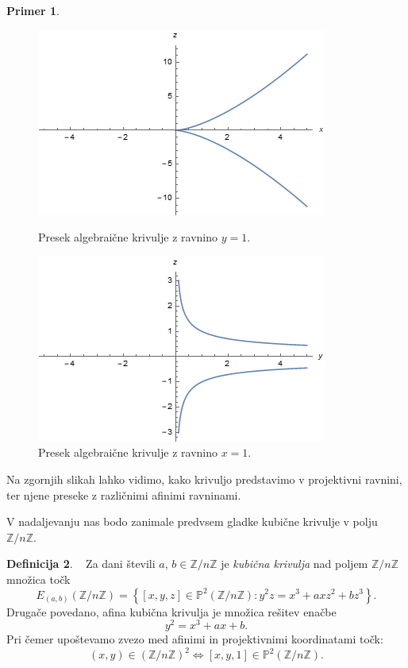 \documentclass[12pt,a4paper,twoside]{article}
\theoremstyle{definition} %
\newtheorem{definicija}{Definicija}[section]
\newtheorem{primer}[definicija]{Primer}
\theoremstyle{plain} %
\numberwithin{equation}{section}  %
\newcommand{\Z}{\mathbb Z}
\newcommand{\PP}{\mathbb P}
\begin{document}
\begin{primer}
\begin{figure}[ht]
\centering
\begin{minipage}{.5\textwidth}
\centering
\includegraphics[scale=0.5]{images/projektivnay.png}
\caption[Presek algebraične krivulje z ravnino $y=1$.]{Presek algebraične krivulje z ravnino $y=1$.}
\label{fig:projektivnay}
\end{minipage}%
\begin{minipage}{.5\textwidth}
\centering
\includegraphics[scale=0.5]{images/projektivnax.png}
\caption[Presek algebraične krivulje z ravnino $x=1$.]{Presek algebraične krivulje z ravnino $x=1$.}
\label{fig:projektivnax}
\end{minipage}
\end{figure}


Na zgornjih slikah lahko vidimo, kako krivuljo predstavimo v projektivni ravnini, ter njene preseke z različnimi afinimi ravninami.

\end{primer}



V nadaljevanju nas bodo zanimale predvsem gladke kubične krivulje v polju $\mathbb{Z}/n\mathbb{Z}$.

\begin{definicija}~
Za dani števili $a$, $b \in \mathbb{Z}/n\mathbb{Z}$ je \emph{kubična krivulja} nad poljem $\mathbb{Z}/n\mathbb{Z}$ množica točk
$$E_{(a,b)}(\mathbb{Z}/n\mathbb{Z}) =\left\{ [x,y,z] \in \PP^2(\mathbb{Z}/n\mathbb{Z}): y^2z=x^3+axz^2+bz^3 \right\} .$$
Drugače povedano, afina kubična krivulja je množica rešitev enačbe
$$y^2=x^3+ax+b.$$
Pri čemer upoštevamo zvezo med afinimi in projektivnimi koordinatami točk:
$$(x,y)\in (\Z/n\Z)^2 \Leftrightarrow [x,y,1]\in \PP^2(\Z/n\Z).$$

\end{definicija}
\end{document}
